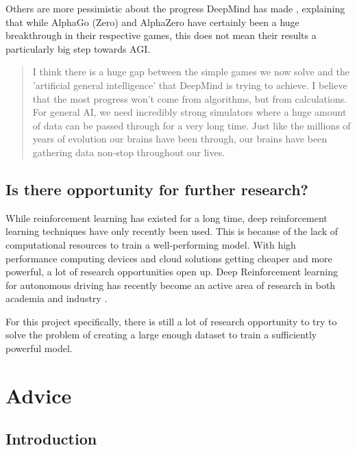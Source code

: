 \documentclass{article}
\begin{document}
Others are more pessimistic about the progress DeepMind has made \cite{moerlandEmailExchangeTuur22, dukezhouAnswerAlphaZeroExample2018},
explaining that while AlphaGo (Zero) and AlphaZero have certainly been a huge breakthrough in their respective games, 
this does not mean their results a particularly big step towards AGI. 

\begin{quotation}
    I think there is a huge gap between the simple games we now solve and the 
    'artificial general intelligence' that DeepMind is trying to achieve.
    I believe that the most progress won't come from algorithms, but from calculations.
    For general AI, we need incredibly strong simulators where a huge amount of data
    can be passed through for a very long time. 
    Just like the millions of years of evolution our brains have been through, our brains
    have been gathering data non-stop throughout our lives. \cite{moerlandEmailExchangeTuur22}
\end{quotation}


\subsection{Is there opportunity for further research?}

While reinforcement learning has existed for a long time, deep reinforcement learning techniques 
have only recently been used. This is because of the lack of computational resources to train
a well-performing model. With high performance computing devices and cloud solutions getting cheaper
and more powerful, a lot of research opportunities open up.
Deep Reinforcement learning for autonomous driving has recently become an active area of research 
in both academia and industry \cite{DeepReinforcementLearning2022a}.

For this project specifically, there is still a lot of research opportunity to try to solve the problem
of creating a large enough dataset to train a sufficiently powerful model.





\newpage
\section{Advice}

\subsection{Introduction}
\end{document}
